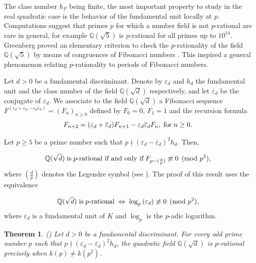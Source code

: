 \documentclass[12pt,reqno]{amsart}
\newtheorem{thm}{Theorem}
\newcommand{\Q}{\mathbb{Q}}
\begin{document}
The class number $h_F$ being finite, the most important property to study in the real quadratic case is the behavior of the fundamental unit
locally at $p$. Computations suggest that primes $p$ for which a number field is not $p$-rational are rare in general, for example $\mathbb{Q}(\sqrt{5})$
is $p$-rational for all primes up to $10^{14}$. Greenberg proved an elementary criterion to check the $p$-rationality of the field $\mathbb{Q}(\sqrt{5})$
by means of congruences of Fibonacci numbers \cite[Corollary 4.5]{Greenberg}. This inspired a general phenomenon relating $p$-rationality to periods of Fibonacci numbers.

Let $d>0$ be a fundamental discriminant. Denote by $\varepsilon_d$
and $h_d$ the fundamental unit and the class number of the field
${\Q}(\sqrt{d})$ respectively, and let $\overline{\varepsilon}_d$ be the conjugate of $\varepsilon_d$. We associate to the field ${\Q}(\sqrt{d})$ a Fibonacci
sequence
$F^{(\varepsilon_d+\overline{\varepsilon}_d,-\varepsilon_d \overline{\varepsilon}_d)}=(F_n)_{n\geq0}$
defined by $F_0=0$, $F_1=1$ and the recursion formula
\begin{equation}\label{recurrence for d}
F_{n+2}=(\varepsilon_d+\overline{\varepsilon}_d)F_{n+1}-\varepsilon_d \overline{\varepsilon}_d F_{n},\; \text{for\;$n\geq0$}.
\end{equation}

Let $p\geq5$ be a prime number such that $p\nmid
(\varepsilon_{d}-\overline{\varepsilon}_{d})^2 h_d$. Then,

\begin{equation*}\label{p-rational and congruences}
{\Q}(\sqrt{d})\; \hbox{is}\; p\hbox{-rational if and only
	if}\; F_{p-(\frac{d}{p})}\not\equiv0\pmod{p^2},
\end{equation*}
where $(\frac{d}{p})$ denotes the Legendre symbol (see \cite[Theorem 3.4]{B2}).
The proof of this result uses the equivalence

\begin{equation*}\label{regulator}
{\Q}(\sqrt{d})\;\hbox{is}\;
p\hbox{-rational}\;\Leftrightarrow\; \log_{p}{(\varepsilon_d)}\not\equiv0\pmod{p^{2}},
\end{equation*}
where $\varepsilon_d$ is a fundamental unit of $K$ and $\log_p$ is
the $p$-adic logarithm.

\begin{thm}\label{periods and p-rationality}(\cite[Theorem 1.1]{B})
	Let $d>0$ be a fundamental discriminant. For every odd prime number
	$p$ such that $p\nmid
	(\varepsilon_d-\overline{\varepsilon_d})^{2}h_d$, the quadratic field ${\Q}(\sqrt{d})$ is
	$p$-rational precisely when $k(p)\neq k(p^{2})$.
\end{thm}
\end{document}
